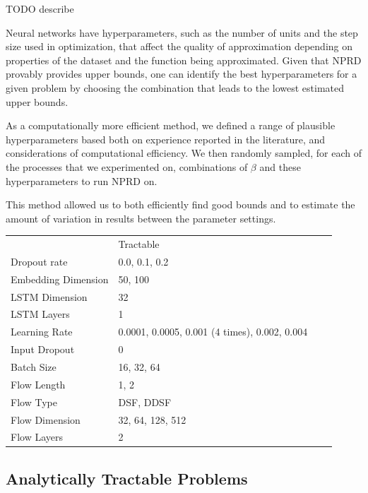 \documentclass[11pt,letterpaper]{article}
\newif \ifcomment
\newcommand\rljf[1]{\ifcomment{{\color{blue}(#1)}}\else{}\fi}
\begin{document}
TODO describe

Neural networks have hyperparameters, such as the number of units and the step size used in optimization, that affect the quality of approximation depending on properties of the dataset and the function being approximated.
Given that NPRD provably provides upper bounds, one can identify the best hyperparameters for a given problem by choosing the combination that leads to the lowest estimated upper bounds.

As a computationally more efficient method, we defined a range of plausible hyperparameters based both on experience reported in the literature, and considerations of computational efficiency.
We then randomly sampled, for each of the processes that we experimented on, combinations of $\beta$ and these hyperparameters to run NPRD on.

This method allowed us to both efficiently find good bounds and to estimate the amount of variation in results between the parameter settings.

\begin{tabular}{llll}
	            & Tractable\rljf{??} \\
	Dropout rate & 0.0, 0.1, 0.2 \\
	Embedding Dimension & 50, 100 \\
	LSTM Dimension & 32 \\
	LSTM Layers & 1 \\
	Learning Rate & 0.0001, 0.0005, 0.001 (4 times), 0.002, 0.004 \\
	Input Dropout & 0 \\
	Batch Size & 16, 32, 64 \\
	Flow Length & 1, 2 \\
	Flow Type & DSF, DDSF \\
	Flow Dimension & 32, 64, 128, 512 \\
	Flow Layers & 2 \\
\end{tabular}



\subsection{Analytically Tractable Problems}
\end{document}
